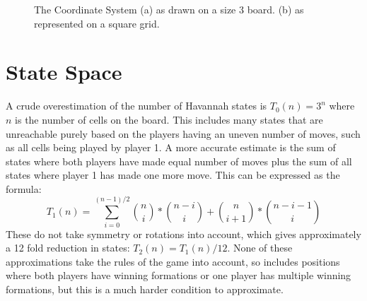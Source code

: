 \begin{figure}
\centering
\caption[The Coordinate System]{The Coordinate System (a) as drawn on a size 3 board. (b) as represented on a square grid.}
\label{fig:coordinates}
\end{figure}


\section{State Space}\label{sec:statespace}

A crude overestimation of the number of Havannah states is $T_0(n) = 3^n$ where $n$ is the number of cells on the board. This includes many states that are unreachable purely based on the players having an uneven number of moves, such as all cells being played by player 1. A more accurate estimate is the sum of states where both players have made equal number of moves plus the sum of all states where player 1 has made one more move. This can be expressed as the formula:
$$T_1(n) = \sum_{i = 0}^{(n-1)/2} {n \choose i}*{n-i \choose i} + {n \choose i + 1}*{n - i - 1 \choose i}$$
These do not take symmetry or rotations into account, which gives approximately a 12 fold reduction in states: $T_2(n) = T_1(n)/12$. None of these approximations take the rules of the game into account, so includes positions where both players have winning formations or one player has multiple winning formations, but this is a much harder condition to approximate.

